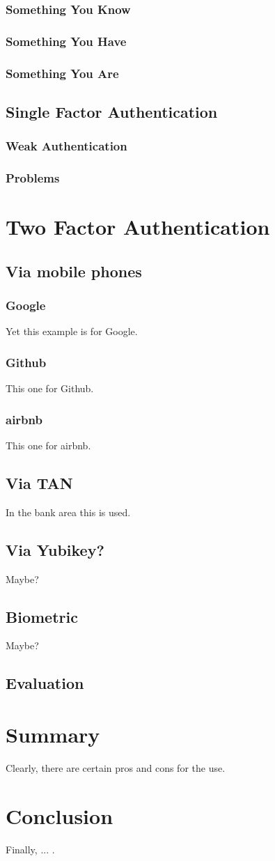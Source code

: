 \documentclass[10pt,a4paper,compsoc]{IEEEtran}
\begin{document}
\subsubsection{Something You Know}
\subsubsection{Something You Have}
\subsubsection{Something You Are}

\subsection{Single Factor Authentication}
\subsubsection{Weak Authentication}
\subsubsection{Problems}

\section{Two Factor Authentication}


\subsection{Via mobile phones}
\subsubsection{Google}
Yet this example is for Google.
\subsubsection{Github}
This one for Github.
\subsubsection{airbnb}
This one for airbnb.
\subsection{Via TAN}
In the bank area this is used.
\subsection{Via Yubikey?}
Maybe?
\subsection{Biometric}
Maybe?
\subsection{Evaluation}
\section{Summary}
Clearly, there are certain pros and cons for the use.
\section{Conclusion}
Finally, ... .


\end{document}
